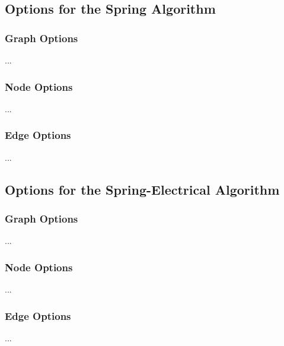 \subsection{Options for the Spring Algorithm}

\subsubsection{Graph Options}

...

\subsubsection{Node Options}

...

\subsubsection{Edge Options}

...

\subsection{Options for the Spring-Electrical Algorithm}

\subsubsection{Graph Options}

...

\subsubsection{Node Options}

...

\subsubsection{Edge Options}

...

